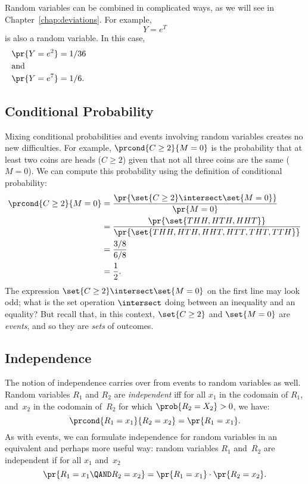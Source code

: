 Random variables can be combined in complicated ways, as we will see
in Chapter~\ref{chap:deviations}.  For example,
\begin{equation*}
    Y = e^T
\end{equation*}
is also a random variable.  In this case,
\begin{align*}
    \pr{Y = e^2} &= 1/36 \\
\noalign{\noindent and}
    \pr{Y = e^7} &= 1/6.
\end{align*}

\subsection{Conditional Probability}

Mixing conditional probabilities and events involving random variables
creates no new difficulties.  For example, $\prcond{C \geq 2}{M = 0}$
is the probability that at least two coins are heads ($C \geq 2$)
given that not all three coins are the same ($M = 0$).  We can compute
this probability using the definition of conditional probability:
\begingroup{}
\begin{align*}
\prcond{C \geq 2}{M = 0}
        & =    \frac{\pr{\set{C \geq 2} \intersect \set{M = 0}}}{\pr{M = 0}} \\
        & =    \frac{\pr{\set{THH, HTH, HHT}}}
                        {\pr{\set{THH, HTH, HHT, HTT, THT, TTH }}} \\
        & =    \frac{3/8}{6/8} \\
        & = \frac{1}{2}.
\end{align*}
\endgroup The expression $\set{C \geq 2} \intersect \set{M = 0}$ on
the first line may look odd; what is the set operation $\intersect$
doing between an inequality and an equality?  But recall that, in this
context, $\set{C \geq 2}$ and $\set{M = 0}$ are \emph{events}, and so
they are \emph{sets} of outcomes.

\subsection{Independence}

The notion of independence carries over from events to random variables as
well.  Random variables $R_1$ and $R_2$ are  \emph{independent} iff for all $x_1$ in the codomain of
$R_1$, and~$x_2$ in the codomain of~$R_2$ for which $\prob{R_2 = X_2}
> 0$, we have:
\[
\prcond{R_1 = x_1}{R_2 = x_2}  =  \pr{R_1 = x_1}.
\]
As with events, we can formulate independence for random variables in
an equivalent and perhaps more useful way: random variables $R_1$
and~$R_2$ are independent if for all $x_1$ and~$x_2$
\[
    \pr{R_1 = x_1 \QAND R_2 = x_2}  =  \pr{R_1 = x_1} \cdot \pr{R_2 = x_2}.
\]

